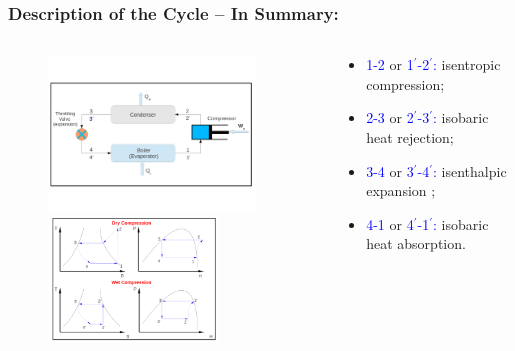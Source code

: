 \documentclass[10pt,compress,handout,ignorenonframetext]{beamer}
\begin{document}
\begin{frame}
 \frametitle{Description of the Cycle -- In Summary:}
  \begin{columns}
   \begin{column}[c]{0.5\linewidth}
    \begin{figure}%
     \vbox{
      \includegraphics[width=5.5cm,clip]{./Pics/Overview_Refrig12}
      \vspace{-.5cm}
      \includegraphics[width=4.5cm,clip]{./Pics/Overview_Refrig13}}
    \end{figure}  
   \end{column}  
   \begin{column}[c]{0.5\linewidth}
  \begin{itemize}
   \item <1-> \textcolor{blue}{1-2} or \textcolor{blue}{1$^{\prime}$-2$^{\prime}$:} isentropic compression;
   \item <1-> \textcolor{blue}{2-3} or \textcolor{blue}{2$^{\prime}$-3$^{\prime}$:} isobaric heat rejection;
   \item <1-> \textcolor{blue}{3-4} or \textcolor{blue}{3$^{\prime}$-4$^{\prime}$:} isenthalpic expansion ;%
   \item <1-> \textcolor{blue}{4-1} or \textcolor{blue}{4$^{\prime}$-1$^{\prime}$:} isobaric heat absorption.
  \end{itemize}
 \end{column}  
\end{columns}
\end{frame}


\end{document}
